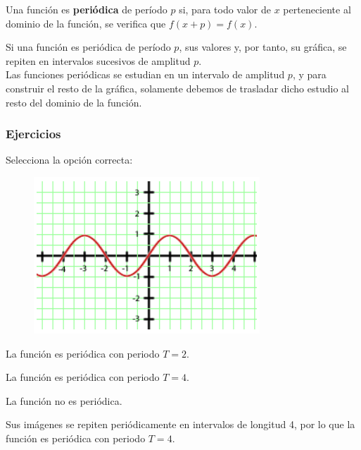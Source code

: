 
\begin{definition}
Una función es \textbf{periódica} de período $p$ si, para todo valor de $x$ perteneciente al dominio de la función, se verifica que $f(x+p)=f(x)$.
\end{definition}
Si una función es periódica de período $p$, sus valores y, por tanto, su gráfica, se repiten en intervalos sucesivos de amplitud $p$.\\
Las funciones periódicas se estudian en un intervalo de amplitud $p$, y para construir el resto de la gráfica, solamente debemos de trasladar dicho estudio al resto del dominio de la función.
\subsubsection{Ejercicios}

\begin{scq}
	Selecciona la opción correcta:\\
	\begin{figure}
		\includegraphics{samples/propiedades/periodicidad1.jpg}
	\end{figure}
	\begin{choices}
		\begin{choice}
			La función es periódica con periodo $T=2$.	
		\end{choice}
		\begin{choice}[x]
			La función es periódica con periodo $T=4$.
		\end{choice}	
		\begin{choice}
			La función no es periódica.
		\end{choice}
	\end{choices}
	\begin{feedback}
		Sus imágenes se repiten periódicamente en intervalos de longitud 4, por lo que la función es periódica con periodo $T=4$.
	\end{feedback}
\end{scq}

